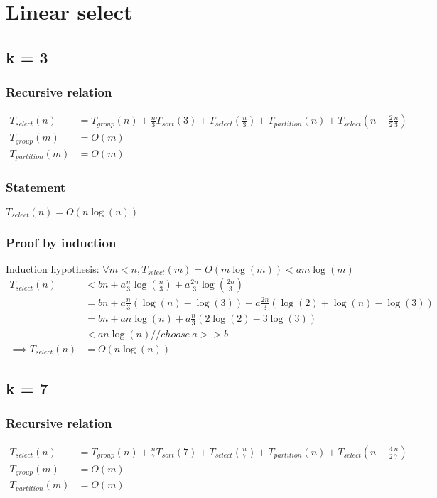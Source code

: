 \documentclass{article}
\begin{document}
\section{Linear select}
\subsection{k = 3}
\subsubsection{Recursive relation}
\begin{align*}
T_{select}(n) &= T_{group}(n) + \frac{n}{3}T_{sort}(3) + T_{select}(\frac{n}{3})
+T_{partition}(n) + T_{select}(n - \frac{2}{2}\frac{n}{3})\\
T_{group}(m) &= O(m)\\
T_{partition}(m) &= O(m)
\end{align*}
\subsubsection{Statement}
$T_{select}(n) = O(n \log (n))$
\subsubsection{Proof by induction}
Induction hypothesis: $\forall m < n, T_{select}(m) = O(m\log(m)) < am\log(m)$
\begin{align*}
T_{select}(n)
&< bn + a\frac{n}{3}\log(\frac{n}{3}) + a\frac{2n}{3}\log(\frac{2n}{3})\\
&= bn + a\frac{n}{3}(\log(n) - \log(3)) +
a \frac{2n}{3}(\log(2)+\log(n)-\log(3))\\
&= bn + an \log(n) + a\frac{n}{3}(2\log(2)-3\log(3))\\
&< an \log(n) //choose \ a >> b \\
\implies T_{select}(n) &= O(n \log(n))
\end{align*}
\subsection{k = 7}
\subsubsection{Recursive relation}
\begin{align*}
T_{select}(n) &= T_{group}(n) + \frac{n}{7}T_{sort}(7) + T_{select}(\frac{n}{7})
+T_{partition}(n) + T_{select}(n-\frac{4}{2}\frac{n}{7})\\
T_{group}(m) &= O(m)\\
T_{partition}(m) &= O(m)
\end{align*}
\end{document}
